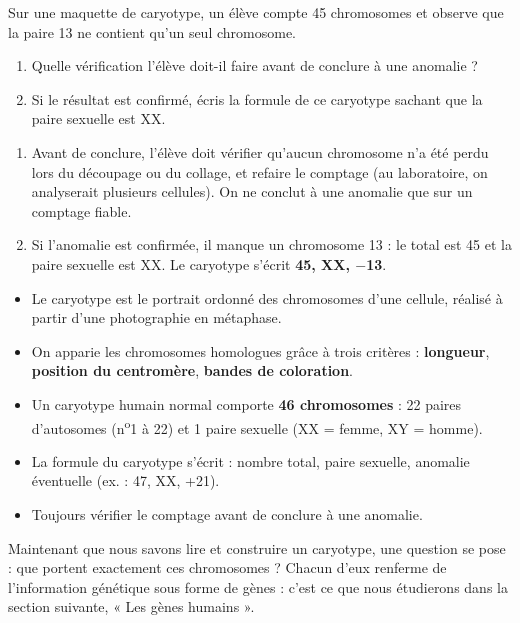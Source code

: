 \documentclass[11pt]{article}
\newcommand{\cle}[1]{{\popxbold\color{popdark}#1}}
\begin{document}
\begin{exercice}
Sur une maquette de caryotype, un élève compte 45 chromosomes et observe que la paire 13 ne contient qu'un seul chromosome.
\begin{enumerate}
\item Quelle vérification l'élève doit-il faire avant de conclure à une anomalie ?
\item Si le résultat est confirmé, écris la formule de ce caryotype sachant que la paire sexuelle est XX.
\end{enumerate}
\end{exercice}

\begin{corrige}[Exercice]
\begin{enumerate}
\item Avant de conclure, l'élève doit vérifier qu'aucun chromosome n'a été perdu lors du découpage ou du collage, et refaire le comptage (au laboratoire, on analyserait plusieurs cellules). On ne conclut à une anomalie que sur un comptage fiable.
\item Si l'anomalie est confirmée, il manque un chromosome 13 : le total est 45 et la paire sexuelle est XX. Le caryotype s'écrit \textbf{45, XX, $-$13}.
\end{enumerate}
\end{corrige}

\begin{aretenir}[L'essentiel du TP N°3]
\begin{itemize}
\item Le \cle{caryotype} est le portrait ordonné des chromosomes d'une cellule, réalisé à partir d'une photographie en métaphase.
\item On apparie les chromosomes homologues grâce à trois critères : \textbf{longueur}, \textbf{position du centromère}, \textbf{bandes de coloration}.
\item Un caryotype humain normal comporte \textbf{46 chromosomes} : 22 paires d'autosomes (n\textsuperscript{o}1 à 22) et 1 paire sexuelle (XX = femme, XY = homme).
\item La formule du caryotype s'écrit : nombre total, paire sexuelle, anomalie éventuelle (ex. : 47, XX, +21).
\item Toujours vérifier le comptage avant de conclure à une anomalie.
\end{itemize}
\end{aretenir}

Maintenant que nous savons lire et construire un caryotype, une question se pose : que portent exactement ces chromosomes ? Chacun d'eux renferme de l'information génétique sous forme de \cle{gènes} : c'est ce que nous étudierons dans la section suivante, « Les gènes humains ».
\end{document}
